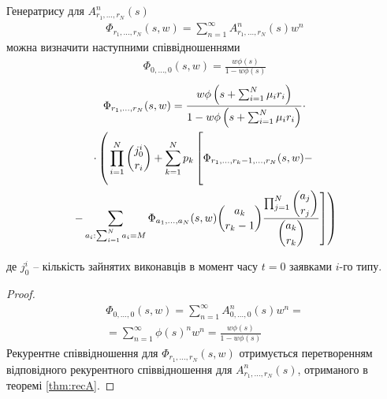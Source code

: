 \documentclass{KnuBulletin}
\begin{document}
\begin{multicols}{2}
    \begin{corollary}
        \label{thm:recPhi}        
        Генератрису для $A_{r_1,...,r_N}^{n}(s)$
        \begin{gather}
        \Phi_{r_1,...,r_N}(s,w) = \sum_{n=1}^{\infty} A_{r_1,...,r_N}^{n}(s) w^n
        \end{gather}
        можна визначити наступними співвідношеннями
        \begin{gather*}
        \Phi_{0,\dots,0}(s,w) 
        = \frac{w \phi(s)}{1-w \phi(s)}
        \end{gather*}
        \begin{multline*}
        \Phi_{r_1,...,r_N}(s,w)
        =
        \frac
        {w \phi\left(s+\sum_{i=1}^N \mu_i r_i\right)}
        {1- w \phi\left(s+\sum_{i=1}^N \mu_i r_i\right)}
        \cdot\\\cdot
        \left(\vphantom{\sum_\sum}
        \prod_{i=1}^N \dbinom{j_{0}^i}{r_i}
        +
        \sum_{k=1}^N p_k
        \left[\vphantom{\sum_\sum}
        \Phi_{r_1,\dots,r_{k}-1,\dots,r_N}(s,w)
        -
        \right.\right.\\\left.\left.
        -
        \sum_{a_i: \sum_{i=1}^N a_i = M}
        \Phi_{a_1,...,a_N}(s,w)
        \dbinom{a_k}{r_k-1}
        \frac{\prod_{j=1}^N \dbinom{a_j}{r_j}} {\dbinom{a_k}{r_k}}
        \right]
        \right)
        \end{multline*}
            
        де $j_{0}^i$ -- кількість зайнятих виконавців в момент часу $t=0$ заявками $i$-го типу.
    \end{corollary}
\begin{proof}
	\begin{multline*}
	  \Phi_{0,\dots,0}(s,w) 
	  = \sum_{n=1}^{\infty} A_{0,\dots,0}^{n}(s) w^n
	  =\\= 
	  \sum_{n=1}^{\infty} \phi(s)^n w^n
	  = \frac{w \phi(s)}{1-w \phi(s)}
	\end{multline*}
    Рекурентне співвідношення для $\Phi_{r_1,\dots,r_N}(s,w)$ отримується 
    перетворенням відповідного рекурентного співвідношення для $A_{r_1,\dots,r_N}^n(s)$,
    отриманого в теоремі \ref{thm:recA}.
    

\end{proof}
\end{multicols}
\end{document}
